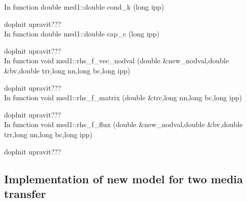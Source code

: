 In function {\sf double med1::double cond\_k (long ipp)}

doplnit upravit???\\


In function {\sf double med1::double cap\_c (long ipp)}

doplnit upravit???\\

In function {\sf void med1::rhs\_f\_vec\_nodval (double \&new\_nodval,double \&bv,double trr,long nn,long bc,long ipp)}

doplnit upravit???\\

In function {\sf void med1::rhs\_f\_matrix (double \&trc,long nn,long bc,long ipp)}

doplnit upravit???\\

In function {\sf void med1::rhs\_f\_flux (double \&new\_nodval,double \&bv,double trr,long nn,long bc,long ipp)}

doplnit upravit???\\

\subsection{Implementation of new model for two media transfer}

